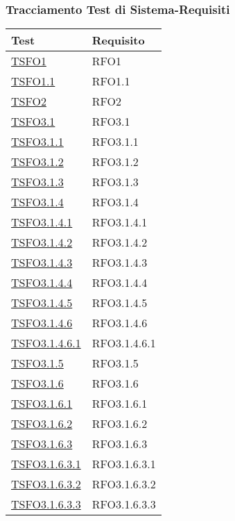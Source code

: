 \subsubsection{Tracciamento Test di Sistema-Requisiti}
\normalsize
\begin{longtable}{|>{\centering}m{5cm}|m{5cm}<{\centering}|}
\hline 
\textbf{Test} & \textbf{Requisito}\\
\hline
\endhead
\hyperlink{TSFO1}{TSFO1} & RFO1\\ \hline
\hyperlink{TSFO1.1}{TSFO1.1} & RFO1.1\\ \hline
\hyperlink{TSFO2}{TSFO2} & RFO2\\ \hline
\hyperlink{TSFO3.1}{TSFO3.1} & RFO3.1\\ \hline
\hyperlink{TSFO3.1.1}{TSFO3.1.1} & RFO3.1.1\\ \hline
\hyperlink{TSFO3.1.2}{TSFO3.1.2} & RFO3.1.2\\ \hline
\hyperlink{TSFO3.1.3}{TSFO3.1.3} & RFO3.1.3\\ \hline
\hyperlink{TSFO3.1.4}{TSFO3.1.4} & RFO3.1.4\\ \hline
\hyperlink{TSFO3.1.4.1}{TSFO3.1.4.1} & RFO3.1.4.1\\ \hline
\hyperlink{TSFO3.1.4.2}{TSFO3.1.4.2} & RFO3.1.4.2\\ \hline
\hyperlink{TSFO3.1.4.3}{TSFO3.1.4.3} & RFO3.1.4.3\\ \hline
\hyperlink{TSFO3.1.4.4}{TSFO3.1.4.4} & RFO3.1.4.4\\ \hline
\hyperlink{TSFO3.1.4.5}{TSFO3.1.4.5} & RFO3.1.4.5\\ \hline
\hyperlink{TSFO3.1.4.6}{TSFO3.1.4.6} & RFO3.1.4.6\\ \hline
\hyperlink{TSFO3.1.4.6.1}{TSFO3.1.4.6.1} & RFO3.1.4.6.1\\ \hline
\hyperlink{TSFO3.1.5}{TSFO3.1.5} & RFO3.1.5\\ \hline
\hyperlink{TSFO3.1.6}{TSFO3.1.6} & RFO3.1.6\\ \hline
\hyperlink{TSFO3.1.6.1}{TSFO3.1.6.1} & RFO3.1.6.1\\ \hline
\hyperlink{TSFO3.1.6.2}{TSFO3.1.6.2} & RFO3.1.6.2\\ \hline
\hyperlink{TSFO3.1.6.3}{TSFO3.1.6.3} & RFO3.1.6.3\\ \hline
\hyperlink{TSFO3.1.6.3.1}{TSFO3.1.6.3.1} & RFO3.1.6.3.1\\ \hline
\hyperlink{TSFO3.1.6.3.2}{TSFO3.1.6.3.2} & RFO3.1.6.3.2\\ \hline
\hyperlink{TSFO3.1.6.3.3}{TSFO3.1.6.3.3} & RFO3.1.6.3.3\\ \hline

\end{longtable}

